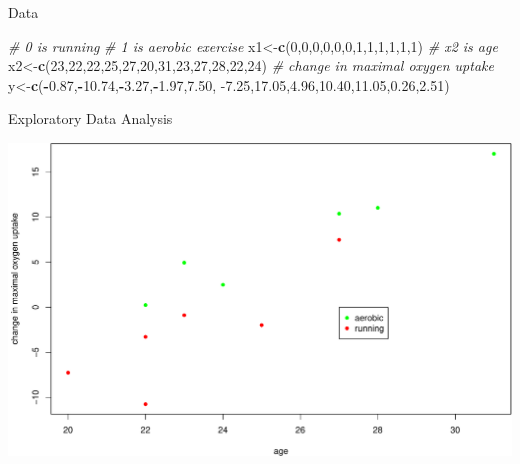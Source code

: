 \documentclass[
  ignorenonframetext,
]{beamer}
\newenvironment{Shaded}{\begin{snugshade}}{\end{snugshade}}
\newcommand{\CommentTok}[1]{\textcolor[rgb]{0.56,0.35,0.01}{\textit{#1}}}
\newcommand{\DecValTok}[1]{\textcolor[rgb]{0.00,0.00,0.81}{#1}}
\newcommand{\FloatTok}[1]{\textcolor[rgb]{0.00,0.00,0.81}{#1}}
\newcommand{\KeywordTok}[1]{\textcolor[rgb]{0.13,0.29,0.53}{\textbf{#1}}}
\newcommand{\NormalTok}[1]{#1}
\newcommand{\OperatorTok}[1]{\textcolor[rgb]{0.81,0.36,0.00}{\textbf{#1}}}
\begin{document}
\begin{frame}[fragile]{Data}
\protect\hypertarget{data}{}

\begin{Shaded}
\begin{Highlighting}[]
\CommentTok{# 0 is running}
\CommentTok{# 1 is aerobic exercise}
\NormalTok{x1<-}\KeywordTok{c}\NormalTok{(}\DecValTok{0}\NormalTok{,}\DecValTok{0}\NormalTok{,}\DecValTok{0}\NormalTok{,}\DecValTok{0}\NormalTok{,}\DecValTok{0}\NormalTok{,}\DecValTok{0}\NormalTok{,}\DecValTok{1}\NormalTok{,}\DecValTok{1}\NormalTok{,}\DecValTok{1}\NormalTok{,}\DecValTok{1}\NormalTok{,}\DecValTok{1}\NormalTok{,}\DecValTok{1}\NormalTok{)}
\CommentTok{# x2 is age}
\NormalTok{x2<-}\KeywordTok{c}\NormalTok{(}\DecValTok{23}\NormalTok{,}\DecValTok{22}\NormalTok{,}\DecValTok{22}\NormalTok{,}\DecValTok{25}\NormalTok{,}\DecValTok{27}\NormalTok{,}\DecValTok{20}\NormalTok{,}\DecValTok{31}\NormalTok{,}\DecValTok{23}\NormalTok{,}\DecValTok{27}\NormalTok{,}\DecValTok{28}\NormalTok{,}\DecValTok{22}\NormalTok{,}\DecValTok{24}\NormalTok{)}
\CommentTok{# change in maximal oxygen uptake}
\NormalTok{y<-}\KeywordTok{c}\NormalTok{(}\OperatorTok{-}\FloatTok{0.87}\NormalTok{,}\OperatorTok{-}\FloatTok{10.74}\NormalTok{,}\OperatorTok{-}\FloatTok{3.27}\NormalTok{,}\OperatorTok{-}\FloatTok{1.97}\NormalTok{,}\FloatTok{7.50}\NormalTok{,}
     \FloatTok{-7.25}\NormalTok{,}\FloatTok{17.05}\NormalTok{,}\FloatTok{4.96}\NormalTok{,}\FloatTok{10.40}\NormalTok{,}\FloatTok{11.05}\NormalTok{,}\FloatTok{0.26}\NormalTok{,}\FloatTok{2.51}\NormalTok{)}
\end{Highlighting}
\end{Shaded}

\end{frame}

\begin{frame}{Exploratory Data Analysis}
\protect\hypertarget{exploratory-data-analysis}{}

\includegraphics{9-linear-regression_files/figure-beamer/unnamed-chunk-2-1.pdf}

\end{frame}
\end{document}
